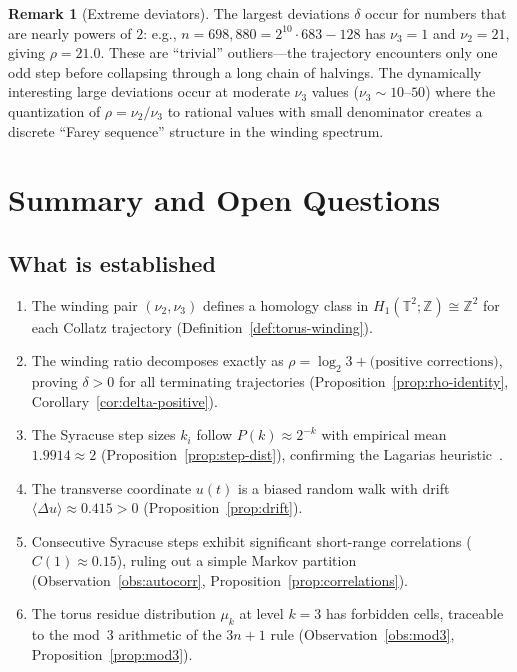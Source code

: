 \documentclass[11pt,a4paper]{article}
\newcommand{\Z}{\mathbb{Z}}
\newcommand{\T}{\mathbb{T}}
\theoremstyle{plain}
\theoremstyle{definition}
\newtheorem{remark}[theorem]{Remark}
\begin{document}
\begin{remark}[Extreme deviators]
    The largest deviations $\delta$ occur for numbers that are nearly powers of $2$: e.g., $n = 698{,}880 = 2^{10} \cdot 683 - 128$ has $\nu_3 = 1$ and $\nu_2 = 21$, giving $\rho = 21.0$. These are ``trivial'' outliers---the trajectory encounters only one odd step before collapsing through a long chain of halvings. The dynamically interesting large deviations occur at moderate $\nu_3$ values ($\nu_3 \sim 10$--$50$) where the quantization of $\rho = \nu_2/\nu_3$ to rational values with small denominator creates a discrete ``Farey sequence'' structure in the winding spectrum.
\end{remark}


\section{Summary and Open Questions}\label{sec:open}

\subsection{What is established}

\begin{enumerate}
    \item The winding pair $(\nu_2, \nu_3)$ defines a homology class in $H_1(\T^2; \Z) \cong \Z^2$ for each Collatz trajectory (Definition~\ref{def:torus-winding}).

    \item The winding ratio decomposes exactly as $\rho = \log_2 3 + \text{(positive corrections)}$, proving $\delta > 0$ for all terminating trajectories (Proposition~\ref{prop:rho-identity}, Corollary~\ref{cor:delta-positive}).

    \item The Syracuse step sizes $k_i$ follow $P(k) \approx 2^{-k}$ with empirical mean $1.9914 \approx 2$ (Proposition~\ref{prop:step-dist}), confirming the Lagarias heuristic~\cite{Lagarias1985}.

    \item The transverse coordinate $u(t)$ is a biased random walk with drift $\langle \Delta u \rangle \approx 0.415 > 0$ (Proposition~\ref{prop:drift}).

    \item Consecutive Syracuse steps exhibit significant short-range correlations ($C(1) \approx 0.15$), ruling out a simple Markov partition (Observation~\ref{obs:autocorr}, Proposition~\ref{prop:correlations}).

    \item The torus residue distribution $\mu_k$ at level $k = 3$ has forbidden cells, traceable to the mod~3 arithmetic of the $3n+1$ rule (Observation~\ref{obs:mod3}, Proposition~\ref{prop:mod3}).
\end{enumerate}
\end{document}
